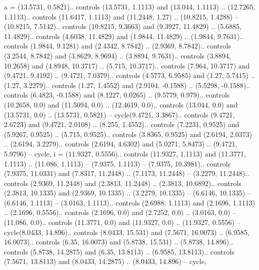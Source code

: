 {a} = {(13.5731, 0.5821).. controls (13.5731, 1.1113) and (13.044, 1.1113) .. (12.7265, 1.1113).. controls (11.6417, 1.1113) and (11.2448, 1.27) .. (10.8215, 1.4288) -- (10.8215, 7.5142).. controls (10.8215, 9.3663) and (9.3927, 11.4829) .. (5.6885, 11.4829).. controls (4.6038, 11.4829) and (1.9844, 11.4829) .. (1.9844, 9.7631).. controls (1.9844, 9.1281) and (2.4342, 8.7842) .. (2.9369, 8.7842).. controls (3.2544, 8.7842) and (3.8629, 8.9694) .. (3.8894, 9.7631).. controls (3.8894, 10.2658) and (4.8948, 10.3717) .. (5.715, 10.3717).. controls (7.964, 10.3717) and (9.4721, 9.4192) .. (9.4721, 7.0379).. controls (4.5773, 6.9585) and (1.27, 5.7415) .. (1.27, 3.2279).. controls (1.27, 1.4552) and (2.9104, -0.1588) .. (5.5298, -0.1588).. controls (6.4823, -0.1588) and (8.1227, 0.0265) .. (9.5779, 0.979).. controls (10.2658, 0.0) and (11.5094, 0.0) .. (12.4619, 0.0).. controls (13.044, 0.0) and (13.5731, 0.0) .. (13.5731, 0.5821) -- cycle(9.4721, 3.3867).. controls (9.4721, 2.6723) and (9.4721, 2.0108) .. (8.255, 1.4552).. controls (7.2231, 0.9525) and (5.9267, 0.9525) .. (5.715, 0.9525).. controls (3.8365, 0.9525) and (2.6194, 2.0373) .. (2.6194, 3.2279).. controls (2.6194, 4.6302) and (5.0271, 5.8473) .. (9.4721, 5.9796) -- cycle},
{i} = {(11.9327, 0.5556).. controls (11.9327, 1.1113) and (11.3771, 1.1113) .. (11.086, 1.1113) -- (7.9375, 1.1113) -- (7.9375, 10.3981).. controls (7.9375, 11.0331) and (7.8317, 11.2448) .. (7.1173, 11.2448) -- (3.2279, 11.2448).. controls (2.9369, 11.2448) and (2.3813, 11.2448) .. (2.3813, 10.6892).. controls (2.3813, 10.1335) and (2.9369, 10.1335) .. (3.2279, 10.1335) -- (6.6146, 10.1335) -- (6.6146, 1.1113) -- (3.0163, 1.1113).. controls (2.6988, 1.1113) and (2.1696, 1.1113) .. (2.1696, 0.5556).. controls (2.1696, 0.0) and (2.7252, 0.0) .. (3.0163, 0.0) -- (11.086, 0.0).. controls (11.3771, 0.0) and (11.9327, 0.0) .. (11.9327, 0.5556) -- cycle(8.0433, 14.896).. controls (8.0433, 15.531) and (7.5671, 16.0073) .. (6.9585, 16.0073).. controls (6.35, 16.0073) and (5.8738, 15.531) .. (5.8738, 14.896).. controls (5.8738, 14.2875) and (6.35, 13.8113) .. (6.9585, 13.8113).. controls (7.5671, 13.8113) and (8.0433, 14.2875) .. (8.0433, 14.896) -- cycle},
